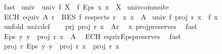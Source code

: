 \begin{isabellebody}
\ fast\isanewline
{}\isamarkupfalse%
%
\endisatagproof
{\isafoldproof}%
%
\isadelimproof
\isanewline
%
\endisadelimproof
\isanewline
{}\isamarkupfalse%
\ univ\ \ {\isachardoublequoteopen}univ\ f\ X\ {\isacharequal}{\kern0pt}{\isacharequal}{\kern0pt}\ f\ {\isacharparenleft}{\kern0pt}Eps\ {\isacharparenleft}{\kern0pt}{\isasymlambda}x{\isachardot}{\kern0pt}\ x\ {\isasymin}\ X{\isacharparenright}{\kern0pt}{\isacharparenright}{\kern0pt}{\isachardoublequoteclose}\isanewline
\isanewline
{}\isamarkupfalse%
\ univ{\isacharunderscore}{\kern0pt}commute{\isacharcolon}{\kern0pt}\isanewline
{}\ ECH{\isacharcolon}{\kern0pt}\ {\isachardoublequoteopen}equiv\ A\ r{\isachardoublequoteclose}\ \ RES{\isacharcolon}{\kern0pt}\ {\isachardoublequoteopen}f\ respects\ r{\isachardoublequoteclose}\ \ x{\isacharcolon}{\kern0pt}\ {\isachardoublequoteopen}x\ {\isasymin}\ A{\isachardoublequoteclose}\isanewline
{}\ {\isachardoublequoteopen}{\isacharparenleft}{\kern0pt}univ\ f{\isacharparenright}{\kern0pt}\ {\isacharparenleft}{\kern0pt}proj\ r\ x{\isacharparenright}{\kern0pt}\ {\isacharequal}{\kern0pt}\ f\ x{\isachardoublequoteclose}\isanewline
%
\isadelimproof
%
\endisadelimproof
%
\isatagproof
{}\isamarkupfalse%
\ {\isacharparenleft}{\kern0pt}unfold\ univ{\isacharunderscore}{\kern0pt}def{\isacharparenright}{\kern0pt}\isanewline
\ \ \isamarkupfalse%
\ prj{\isacharcolon}{\kern0pt}\ {\isachardoublequoteopen}proj\ r\ x\ {\isasymin}\ A{\isacharslash}{\kern0pt}{\isacharslash}{\kern0pt}r{\isachardoublequoteclose}\ \isamarkupfalse%
\ x\ proj{\isacharunderscore}{\kern0pt}preserves\ \isamarkupfalse%
\ fast\isanewline
\ \ \isamarkupfalse%
\ {\isachardoublequoteopen}Eps\ {\isacharparenleft}{\kern0pt}{\isasymlambda}y{\isachardot}{\kern0pt}\ y\ {\isasymin}\ proj\ r\ x{\isacharparenright}{\kern0pt}\ {\isasymin}\ A{\isachardoublequoteclose}\ \isamarkupfalse%
\ ECH\ equiv{\isacharunderscore}{\kern0pt}Eps{\isacharunderscore}{\kern0pt}preserves\ \isamarkupfalse%
\ fast\isanewline
\ \ \isamarkupfalse%
\ \isamarkupfalse%
\ {\isachardoublequoteopen}proj\ r\ {\isacharparenleft}{\kern0pt}Eps\ {\isacharparenleft}{\kern0pt}{\isasymlambda}y{\isachardot}{\kern0pt}\ y\ {\isasymin}\ proj\ r\ x{\isacharparenright}{\kern0pt}{\isacharparenright}{\kern0pt}\ {\isacharequal}{\kern0pt}\ proj\ r\ x{\isachardoublequoteclose}\ \isamarkupfalse%

\end{isabellebody}
